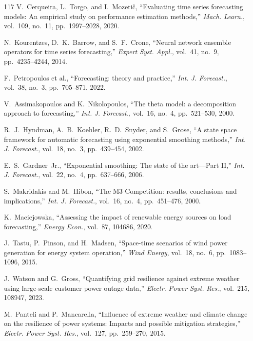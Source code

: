 \documentclass[12pt,a4paper]{article}
\begin{document}
\begin{thebibliography}{117}
 V.~Cerqueira, L.~Torgo, and I.~Mozeti\v{c}, ``Evaluating time series forecasting models: An empirical study on performance estimation methods,'' \textit{Mach. Learn.}, vol.~109, no.~11, pp.~1997--2028, 2020.

 N.~Kourentzes, D.~K.~Barrow, and S.~F.~Crone, ``Neural network ensemble operators for time series forecasting,'' \textit{Expert Syst. Appl.}, vol.~41, no.~9, pp.~4235--4244, 2014.

 F.~Petropoulos et al., ``Forecasting: theory and practice,'' \textit{Int. J. Forecast.}, vol.~38, no.~3, pp.~705--871, 2022.

 V.~Assimakopoulos and K.~Nikolopoulos, ``The theta model: a decomposition approach to forecasting,'' \textit{Int. J. Forecast.}, vol.~16, no.~4, pp.~521--530, 2000.

 R.~J.~Hyndman, A.~B.~Koehler, R.~D.~Snyder, and S.~Grose, ``A state space framework for automatic forecasting using exponential smoothing methods,'' \textit{Int. J. Forecast.}, vol.~18, no.~3, pp.~439--454, 2002.

 E.~S.~Gardner~Jr., ``Exponential smoothing: The state of the art---Part II,'' \textit{Int. J. Forecast.}, vol.~22, no.~4, pp.~637--666, 2006.

 S.~Makridakis and M.~Hibon, ``The M3-Competition: results, conclusions and implications,'' \textit{Int. J. Forecast.}, vol.~16, no.~4, pp.~451--476, 2000.

 K.~Maciejowska, ``Assessing the impact of renewable energy sources on load forecasting,'' \textit{Energy Econ.}, vol.~87, 104686, 2020.

 J.~Tastu, P.~Pinson, and H.~Madsen, ``Space-time scenarios of wind power generation for energy system operation,'' \textit{Wind Energy}, vol.~18, no.~6, pp.~1083--1096, 2015.

 J.~Watson and G.~Gross, ``Quantifying grid resilience against extreme weather using large-scale customer power outage data,'' \textit{Electr. Power Syst. Res.}, vol.~215, 108947, 2023.

 M.~Panteli and P.~Mancarella, ``Influence of extreme weather and climate change on the resilience of power systems: Impacts and possible mitigation strategies,'' \textit{Electr. Power Syst. Res.}, vol.~127, pp.~259--270, 2015.


\end{thebibliography}
\end{document}
